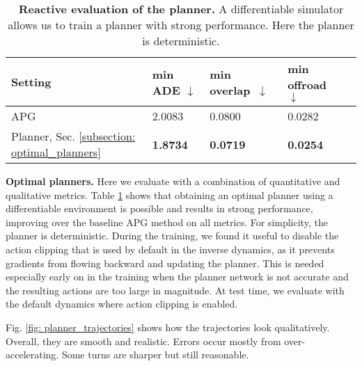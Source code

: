 \begin{table}[h]
    \small
    \centering
    \begin{tabular}[width=\textwidth]{ p{} | p{} p{} p{} p{} } \toprule[1.5pt]
         \textbf{Setting} & min ADE $\downarrow$ & min \mbox{overlap $\downarrow$} &  min offroad $\downarrow$  \\
         \midrule[1pt]
         APG \cite{nachkov2024autonomous} & 2.0083 &  0.0800 & 0.0282 \\
         Planner, Sec. \ref{subsection: optimal_planners} & \textbf{1.8734} &  \textbf{0.0719} & \textbf{0.0254} \\   
         \bottomrule[1.5pt]
    \end{tabular}
    \captionsetup{aboveskip=0.3cm, belowskip=-0.3cm}
    \caption{\textbf{Reactive evaluation of the planner.} A differentiable simulator allows us to train a planner with strong performance. Here the planner is deterministic.}
    \label{table: planner_reactive}
\end{table}


\textbf{Optimal planners.} Here we evaluate with a combination of quantitative and qualitative metrics. Table \ref{table: planner_reactive} shows that obtaining an optimal planner using a differentiable environment is possible and results in strong performance, improving over the baseline APG method \cite{nachkov2024autonomous} on all metrics. For simplicity, the planner is deterministic. During the training, we found it useful to disable the action clipping that is used by default in the inverse dynamics, as it prevents gradients from 
flowing backward and updating the planner. This is needed especially early on in the training when the planner network is not accurate and the resulting actions are too large in magnitude. At test time, we evaluate with the default dynamics where action clipping is enabled.

Fig. \ref{fig: planner_trajectories} shows how the trajectories look qualitatively. Overall, they are smooth and realistic. Errors occur mostly from over-accelerating. Some turns are sharper but still reasonable.


